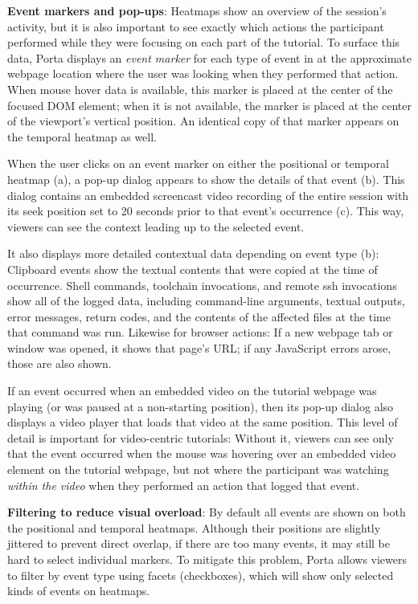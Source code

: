 \textbf{Event markers and pop-ups}: Heatmaps show an overview of the
session's activity, but it is also important to see exactly which
actions the participant performed while they were focusing on each part
of the tutorial. To surface this data, Porta displays an \emph{event
marker} for each type of event in  at the approximate
webpage location where the user was looking when they performed that
action. When mouse hover data is available, this marker is placed at the
center of the focused DOM element; when it is not available, the marker
is placed at the center of the viewport's vertical position. An
identical copy of that marker appears on the temporal heatmap as well.

When the user clicks on an event marker on either the positional or
temporal heatmap (a), a pop-up dialog appears to show the
details of that event (b). This dialog contains an
embedded screencast video recording of the entire session with its seek
position set to 20 seconds prior to that event's occurrence
(c). This way, viewers can see the context leading up to
the selected event.

It also displays more detailed contextual data depending on
event type (b): Clipboard events show the textual contents that were copied
at the time of occurrence. Shell commands, toolchain invocations, and
remote ssh invocations show all of the logged data, including
command-line arguments, textual outputs, error messages, return codes,
and the contents of the affected files at the time
that command was run. Likewise for browser actions: If a new webpage tab
or window was opened, it shows that page's URL; if any JavaScript errors
arose, those are also shown.

If an event occurred when an embedded video on the tutorial
webpage was playing (or was paused at a non-starting position), then its
pop-up dialog also displays a video player that loads that video at the same position.
This level of detail is important for
video-centric tutorials: Without it, viewers can see only that the event
occurred when the mouse was hovering over an embedded video element on
the tutorial webpage, but not where the participant was watching \emph{within
the video} when they performed an action that logged that event.


\textbf{Filtering to reduce visual overload}:
%
By default all events are shown on both the positional and temporal
heatmaps. Although their positions are slightly jittered to prevent
direct overlap, if there are too many events, it may still be hard to
select individual markers. To mitigate this problem, Porta allows
viewers to filter by event type using facets (checkboxes), which will
show only selected kinds of events on heatmaps.

